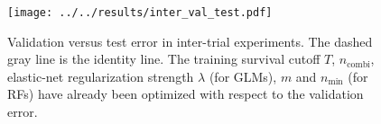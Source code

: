 \begin{figure}
    \centering
    \texttt{[image: ../../results/inter\_val\_test.pdf]}
    \caption{Validation versus test error in inter-trial experiments. The dashed gray line is the 
        identity line. The training survival cutoff $T$, 
        $n_\text{combi}$, elastic-net regularization strength $\lambda$ (for GLMs), 
        $m$ and $n_\text{min}$ (for RFs) have already been optimized with respect to the 
        validation error.}
    \label{fig:inter-val-test}
\end{figure}